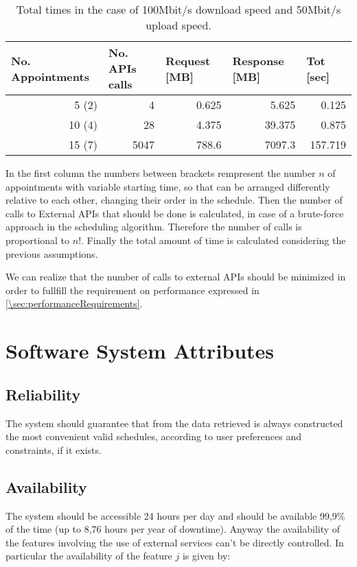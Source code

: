 \begin{table}[htbp]
  \centering
    \begin{tabular}{|r|r|r|r|r|}
    \hline
    \multicolumn{1}{|l|}{\textbf{No. Appointments}} & \multicolumn{1}{l|}{\textbf{No. APIs calls}} & \multicolumn{1}{l|}{\textbf{Request [MB]}} & \multicolumn{1}{l|}{\textbf{Response [MB]}} & \multicolumn{1}{l|}{\textbf{Tot [sec]}} \\ \hline
    5 (2)    & 4   & 0.625 & 5.625 & 0.125 \\ \hline
    10 (4)   & 28 & 4.375 & 39.375 & 0.875 \\ \hline
    15 (7)   & 5047 & 788.6 & 7097.3 & 157.719 \\ \hline
    \end{tabular}%
    \caption{Total times in the case of 100Mbit/s download speed and 50Mbit/s upload speed.}
  \label{tab:addlabel}%
\end{table}%

In the first column the numbers between brackets rempresent the number $n$ of appointments with variable starting time, so that can be arranged differently relative to each other, changing their order in the schedule. Then the number of calls to External APIs that should be done is calculated, in case of a brute-force approach in the scheduling algorithm. Therefore the number of calls is proportional to $n!$.
Finally the total amount of time is calculated considering the previous assumptions.

We can realize that the number of calls to external APIs should be minimized in order to fullfill the requirement on performance expressed in \ref{\sec:performanceRequirements}.

\section{Software System Attributes}

\subsection{Reliability}
The system should guarantee that from the data retrieved is always constructed the most convenient valid schedules, according to user preferences and constraints, if it exists.

\subsection{Availability}
The system should be accessible 24 hours per day and should be available 99,9\% of the time (up to 8,76 hours per year of downtime). Anyway the availability of the features involving the use of external services can't be directly controlled. In particular the availability of the feature $j$ is given by:

